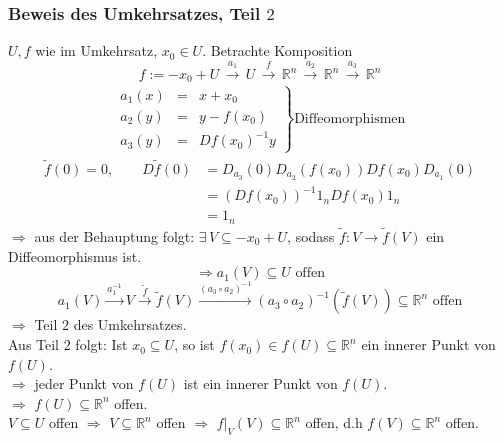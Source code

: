 \subsubsection{Beweis des Umkehrsatzes, Teil $2$} %
\label{ssub:beweis_des_umkehrsatzes_teil_2}
$U,f$ wie im Umkehrsatz, $x_0 \in U$. Betrachte Komposition
\[
	f:= -x_0+U \, \xrightarrow{a_1}\, U \, \xrightarrow{f} \, \mathbb{R}^n \, \xrightarrow{a_2} \, \mathbb{R}^n \, \xrightarrow{a_3} \, \mathbb{R}^n
\]
\begin{align*}
	\left. \begin{array}{rcl}
		a_1(x) & = & x+x_0 \\
		a_2(y) & = & y - f(x_0) \\
		a_3(y) & = & Df(x_0)^{-1}y
	\end{array} \right\} \text{Diffeomorphismen}
\end{align*}
\begin{align*}
	\tilde f(0)=0, \qquad D \tilde f(0) &= D_{a_3}(0)D_{a_2}(f(x_0))Df(x_0)D_{a_1}(0) \\
	&= (Df(x_0))^{-1} 1_n Df(x_0) 1_n  \\
	&= 1_n
\end{align*}
$\Rightarrow$ aus der Behauptung folgt: $\exists\,V \subseteq -x_0+U$, sodass $ \tilde f: V \to \tilde f(V)$ ein Diffeomorphismus ist. \\
\[
	\Rightarrow a_1(V) \subseteq U \text{ offen}
\]
\[
	a_1(V) \xrightarrow{a_1^{-1}} V \xrightarrow{\tilde f} \tilde f(V) \xrightarrow{(a_3 \circ a_2)^{-1}} (a_3 \circ a_2)^{-1}( \tilde f(V)) \subseteq \mathbb{R}^n \text{ offen}
\]
$\Rightarrow$ Teil $2$ des Umkehrsatzes. \\
Aus Teil $2$ folgt: Ist $x_0 \subseteq U$, so ist $f(x_0) \in f(U) \subseteq \mathbb{R}^n$ ein innerer Punkt von $f(U)$. \\
$\Rightarrow$ jeder Punkt von $f(U)$ ist ein innerer Punkt von $f(U)$. \\
$\Rightarrow$ $f(U) \subseteq \mathbb{R}^n$ offen. \\
$V \subseteq U$ offen $\Rightarrow$ $V \subseteq \mathbb{R}^n$ offen $\Rightarrow$ $f  \big|_{V}^{}(V) \subseteq \mathbb{R}^n$ offen, d.h $f(V) \subseteq \mathbb{R}^n$ offen. \bewende
{}
